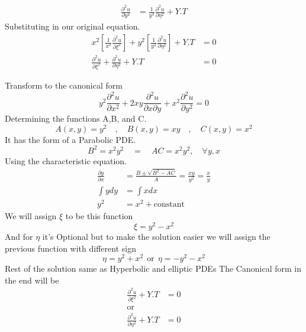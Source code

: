 \documentclass[]{article}
\begin{document}
\begin{example}
\begin{align*}
        \\
        \frac{\partial^2 u}{\partial y^2} &=\frac{1}{y^2}\frac{\partial^2 u}{\partial\eta^2}+Y.T
    \end{align*}
    Substituting in our original equation.
    \begin{align*}
        x^2\left[\frac{1}{x^2}\frac{\partial^2 u}{\partial\xi^2}\right]+y^2\left[\frac{1}{y^2}\frac{\partial^2 u}{\partial\eta^2}\right]+Y.T &= 0
        \\
        \frac{\partial^2 u}{\partial\xi^2}+\frac{\partial^2 u}{\partial\eta^2}+Y.T &=0
    \end{align*}
\end{example}
\begin{example}
    Transform to the canonical form
    \[
        y^2\frac{\partial^2 u}{\partial x^2}+2xy\frac{\partial^2 u}{\partial x\partial y}+x^2\frac{\partial^2 u}{\partial y^2} = 0  
    \]
    Determining the functions A,B, and C.
    \[
        A\left(x,y\right)=y^2  \quad,\quad  B\left(x,y\right)=xy  \quad,\quad  C\left(x,y\right)=x^2    
    \]
    It has the form of a Parabolic PDE.
    \[
        B^2 =x^2 y^2 \quad=\quad AC=x^2 y^2, \quad\forall y, x  
    \]
    Using the characteristic equation.
    \begin{align*}
        \frac{\partial y}{\partial x} &= \frac{B\pm\sqrt{B^2 -AC}}{A} = \frac{xy}{y^2}=\frac{x}{y}
        \\
        \int y dy &= \int x dx 
        \\
        y^2 &= x^2 +\text{constant}
    \end{align*}
    We will assign $\xi$ to be this function
    \[
        \xi = y^2 - x^2
    \]
    And for $\eta$ it's Optional but to make the solution easier we will assign the previous function with different sign  
    \[
        \eta = y^2 + x^2 \ \ \text{or} \ \ \eta = - y^2 - x^2
    \]
    Rest of the solution same as Hyperbolic and elliptic PDEs
    The Canonical form in the end will be 
    \begin{align*}
        \frac{\partial^2 u}{\partial\xi^2}+Y.T &=0
        \\
        \text{or}
        \\
        \frac{\partial^2 u}{\partial\eta^2}+Y.T &=0
    \end{align*}
\end{example}
\end{document}
